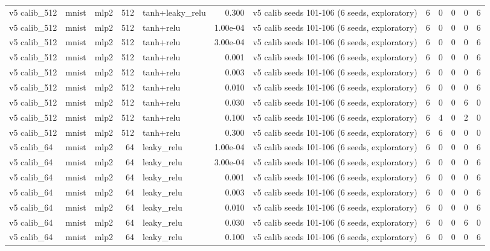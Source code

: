 \begin{table}[htbp]
{\begin{tabular}{@{}lllrlrlrrrrr@{}}
v5 calib\_512 & mnist & mlp2 & 512 & tanh+leaky\_relu & 0.300 & v5 calib seeds 101-106 (6 seeds, exploratory) & 6 & 0 & 0 & 0 & 6 \\
v5 calib\_512 & mnist & mlp2 & 512 & tanh+relu & 1.00e-04 & v5 calib seeds 101-106 (6 seeds, exploratory) & 6 & 0 & 0 & 0 & 6 \\
v5 calib\_512 & mnist & mlp2 & 512 & tanh+relu & 3.00e-04 & v5 calib seeds 101-106 (6 seeds, exploratory) & 6 & 0 & 0 & 0 & 6 \\
v5 calib\_512 & mnist & mlp2 & 512 & tanh+relu & 0.001 & v5 calib seeds 101-106 (6 seeds, exploratory) & 6 & 0 & 0 & 0 & 6 \\
v5 calib\_512 & mnist & mlp2 & 512 & tanh+relu & 0.003 & v5 calib seeds 101-106 (6 seeds, exploratory) & 6 & 0 & 0 & 0 & 6 \\
v5 calib\_512 & mnist & mlp2 & 512 & tanh+relu & 0.010 & v5 calib seeds 101-106 (6 seeds, exploratory) & 6 & 0 & 0 & 0 & 6 \\
v5 calib\_512 & mnist & mlp2 & 512 & tanh+relu & 0.030 & v5 calib seeds 101-106 (6 seeds, exploratory) & 6 & 0 & 0 & 6 & 0 \\
v5 calib\_512 & mnist & mlp2 & 512 & tanh+relu & 0.100 & v5 calib seeds 101-106 (6 seeds, exploratory) & 6 & 4 & 0 & 2 & 0 \\
v5 calib\_512 & mnist & mlp2 & 512 & tanh+relu & 0.300 & v5 calib seeds 101-106 (6 seeds, exploratory) & 6 & 6 & 0 & 0 & 0 \\
v5 calib\_64 & mnist & mlp2 & 64 & leaky\_relu & 1.00e-04 & v5 calib seeds 101-106 (6 seeds, exploratory) & 6 & 0 & 0 & 0 & 6 \\
v5 calib\_64 & mnist & mlp2 & 64 & leaky\_relu & 3.00e-04 & v5 calib seeds 101-106 (6 seeds, exploratory) & 6 & 0 & 0 & 0 & 6 \\
v5 calib\_64 & mnist & mlp2 & 64 & leaky\_relu & 0.001 & v5 calib seeds 101-106 (6 seeds, exploratory) & 6 & 0 & 0 & 0 & 6 \\
v5 calib\_64 & mnist & mlp2 & 64 & leaky\_relu & 0.003 & v5 calib seeds 101-106 (6 seeds, exploratory) & 6 & 0 & 0 & 0 & 6 \\
v5 calib\_64 & mnist & mlp2 & 64 & leaky\_relu & 0.010 & v5 calib seeds 101-106 (6 seeds, exploratory) & 6 & 0 & 0 & 0 & 6 \\
v5 calib\_64 & mnist & mlp2 & 64 & leaky\_relu & 0.030 & v5 calib seeds 101-106 (6 seeds, exploratory) & 6 & 0 & 0 & 6 & 0 \\
v5 calib\_64 & mnist & mlp2 & 64 & leaky\_relu & 0.100 & v5 calib seeds 101-106 (6 seeds, exploratory) & 6 & 0 & 0 & 0 & 6 \\

\end{tabular}}
\end{table}
